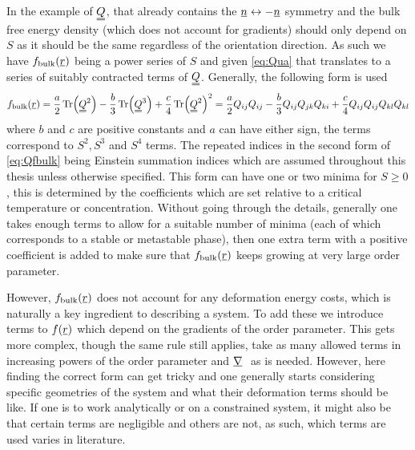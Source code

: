\documentclass[12pt]{article}
\newcommand{\suf}[2]{\stackunder[0.5pt]{\stackunder[1pt]{\ensuremath{#1}}{\rule{\widthof{\ensuremath{#2}}*\real{0.9}}{.1ex}}}{}}
\newcommand{\duf}[2]{\stackunder[0.5pt]{\stackunder[0.8pt]{\stackunder[1pt]{\ensuremath{#1}}{\rule{\widthof{\ensuremath{#2}}*\real{0.9}}{.1ex}}}{\rule{\widthof{\ensuremath{#2}}*\real{0.9}}{.1ex}}}{}}
\newcommand{\su}[1]{\suf{#1}{#1}}
\newcommand{\du}[1]{\duf{#1}{#1}}
\newcommand{\mgrad}{\ensuremath{\suf{\nabla}{K}\,}}
\newcommand{\QQ}{\ensuremath{\du{Q}}}
\begin{document}
        In the example of \QQ, that already contains the $\su{n} \leftrightarrow -\su{n}$ symmetry and the bulk free energy density (which does not account for gradients) should only depend on $S$ as it should be the same regardless of the orientation direction.
        As such we have $f_\text{bulk}(\su{r})$ being a power series of $S$ and given \cref{eq:Qua} that translates to a series of suitably contracted terms of \QQ.
        Generally, the following form is used
        \begin{equation}\label{eq:Qfbulk}
            f_\text{bulk}(\su{r}) = \frac{a}{2} \Tr(\du{Q}^2) - \frac{b}{3} \Tr(\du{Q}^3) + \frac{c}{4} \Tr(\du{Q}^2)^2 = \frac{a}{2} Q_{ij}Q_{ij} - \frac{b}{3} Q_{ij}Q_{jk}Q_{ki} + \frac{c}{4} Q_{ij}Q_{ij}Q_{kl}Q_{kl}
        \end{equation}
        where $b$ and $c$ are positive constants and $a$ can have either sign, the terms correspond to $S^2, S^3$ and $S^4$ terms\cite{brayTheoryPhaseOrdering1993,luckhurstBiaxialNematicLiquid2015}.
        The repeated indices in the second form of \cref{eq:Qfbulk} being Einstein summation indices which are assumed throughout this thesis unless otherwise specified.
        This form can have one or two minima for $S\geq0$, this is determined by the coefficients which are set relative to a critical temperature or concentration.
        Without going through the details, generally one takes enough terms to allow for a suitable number of minima (each of which corresponds to a stable or metastable phase), then one extra term with a positive coefficient is added to make sure that $f_\text{bulk}(\su{r})$ keeps growing at very large order parameter.

        However, $f_\text{bulk}(\su{r})$ does not account for any deformation energy costs, which is naturally a key ingredient to describing a system.
        To add these we introduce terms to $f(\su{r})$ which depend on the gradients of the order parameter.
        This gets more complex, though the same rule still applies, take as many allowed terms in increasing powers of the order parameter and \mgrad\ as is needed.
        However, here finding the correct form can get tricky and one generally starts considering specific geometries of the system and what their deformation terms should be like.
        If one is to work analytically or on a constrained system, it might also be that certain terms are negligible and others are not, as such, which terms are used varies in literature.
\end{document}
